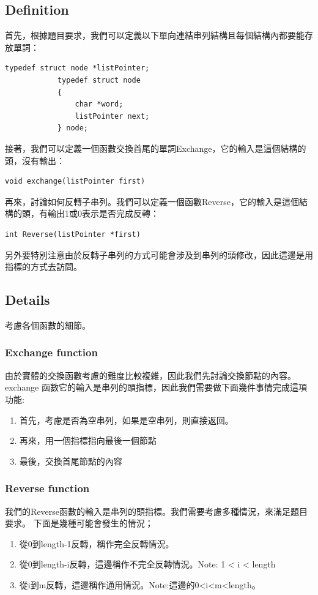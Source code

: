 \documentclass{article}
\begin{document}
	\subsection{Definition}
		首先，根據題目要求，我們可以定義以下單向連結串列結構且每個結構內都要能存放單詞：
		\begin{lstlisting}[style=Cstyle]
			typedef struct node *listPointer;
			typedef struct node
			{
				char *word;
				listPointer next;
			} node;
		\end{lstlisting}
      	接著，我們可以定義一個函數交換首尾的單詞Exchange，它的輸入是這個結構的頭，沒有輸出：
	     \begin{lstlisting}[style=Cstyle]
			void exchange(listPointer first)
		 \end{lstlisting}
		再來，討論如何反轉子串列。我們可以定義一個函數Reverse，它的輸入是這個結構的頭，有輸出1或0表示是否完成反轉：
		\begin{lstlisting}[style=Cstyle]
			int Reverse(listPointer *first)
		\end{lstlisting}
		 另外要特別注意由於反轉子串列的方式可能會涉及到串列的頭修改，因此這邊是用指標的方式去訪問。
	\subsection{Details}
		考慮各個函數的細節。
		\subsubsection{Exchange function}
			 由於實體的交換函數考慮的難度比較複雜，因此我們先討論交換節點的內容。exchange 函數它的輸入是串列的頭指標，因此我們需要做下面幾件事情完成這項功能:

			\begin{enumerate}
				\item 首先，考慮是否為空串列，如果是空串列，則直接返回。
				\item 再來，用一個指標指向最後一個節點
				\item 最後，交換首尾節點的內容
			\end{enumerate}
		\subsubsection{Reverse function}
			我們的Reverse函數的輸入是串列的頭指標。我們需要考慮多種情況，來滿足題目要求。
			下面是幾種可能會發生的情況；
		\begin{enumerate}
			\item 從0到length-1反轉，稱作完全反轉情況。

			\item 從0到length-i反轉，這邊稱作不完全反轉情況。Note: 1 < i < length 
			\item 從i到m反轉，這邊稱作通用情況。Note:這邊的0<i<m<length。
		\end{enumerate}
	
\end{document}
